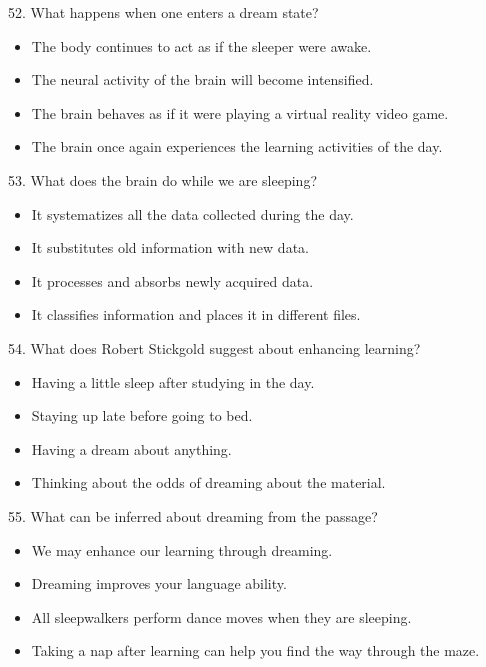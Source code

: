 \documentclass[UTF8,11pt]{ctexart}
\begin{document}
52. What happens when one enters a dream state?


\begin{itemize}[leftmargin=2em,itemsep=.2em,topsep=.4em]\item[A.] The body continues to act as if the sleeper were awake.
\item[B.] The neural activity of the brain will become intensified.
\item[C.] The brain behaves as if it were playing a virtual reality video game.
\item[D.] The brain once again experiences the learning activities of the day.
\end{itemize}

53. What does the brain do while we are sleeping?


\begin{itemize}[leftmargin=2em,itemsep=.2em,topsep=.4em]\item[A.] It systematizes all the data collected during the day.
\item[B.] It substitutes old information with new data.
\item[C.] It processes and absorbs newly acquired data.
\item[D.] It classifies information and places it in different files.
\end{itemize}

54. What does Robert Stickgold suggest about enhancing learning?


\begin{itemize}[leftmargin=2em,itemsep=.2em,topsep=.4em]\item[A.] Having a little sleep after studying in the day.
\item[B.] Staying up late before going to bed.
\item[C.] Having a dream about anything.
\item[D.] Thinking about the odds of dreaming about the material.
\end{itemize}

55. What can be inferred about dreaming from the passage?


\begin{itemize}[leftmargin=2em,itemsep=.2em,topsep=.4em]\item[A.] We may enhance our learning through dreaming.
\item[B.] Dreaming improves your language ability.
\item[C.] All sleepwalkers perform dance moves when they are sleeping.
\item[D.] Taking a nap after learning can help you find the way through the maze.
\end{itemize}
\end{document}
